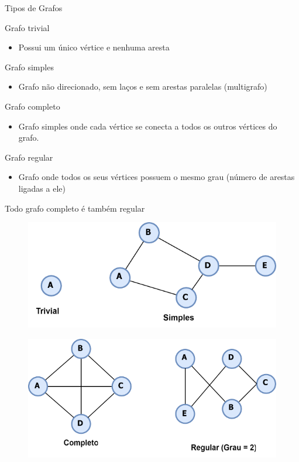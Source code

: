 \documentclass{if-beamer}
\begin{document}
\begin{frame}{Tipos de Grafos} 

\justifying
Grafo trivial
\begin{itemize}
\item  Possui um único vértice e nenhuma aresta
\end{itemize} 
Grafo simples 
\begin{itemize}
\item  Grafo não direcionado, sem laços e sem arestas paralelas (multigrafo)
\end{itemize} 
Grafo completo 
\begin{itemize}
\item  Grafo simples onde cada vértice se conecta a todos os outros vértices do grafo.
\end{itemize} 
Grafo regular
\begin{itemize}
\item  Grafo onde todos os seus vértices possuem o mesmo grau (número de arestas ligadas a ele) 
\end{itemize} 

Todo grafo completo é também regular

\begin{figure}[h]
\centering
\begin{minipage}[b]{0.45\textwidth}
  \includegraphics[width=\textwidth]{Figuras/exemplos-grafo/l_svg-tex.pdf}
  \label{fig:imagem2}
\end{minipage}
\hfill
\begin{minipage}[b]{0.45\textwidth}
  \includegraphics[width=\textwidth]{Figuras/exemplos-grafo/m_svg-tex.pdf}
  \label{fig:imagem3}
\end{minipage}
\end{figure}
\end{frame}
\end{document}
